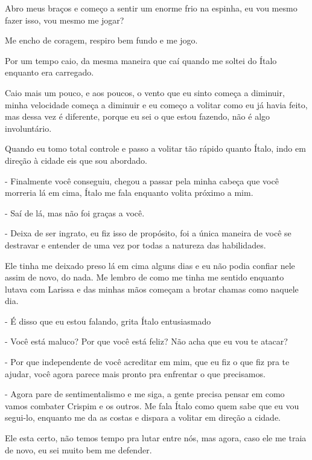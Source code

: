 Abro meus braços e começo a sentir um enorme frio na espinha, eu vou mesmo fazer isso, vou mesmo me jogar?

Me encho de coragem, respiro bem fundo e me jogo.

Por um tempo caio, da mesma maneira que caí quando me soltei do Ítalo enquanto era carregado.

Caio mais um pouco, e aos poucos, o vento que eu sinto começa a diminuir, minha velocidade começa a diminuir e eu começo a volitar como eu já havia feito, mas dessa vez é diferente, porque eu sei o que estou fazendo, não é algo involuntário.

Quando eu tomo total controle e passo a volitar tão rápido quanto Ítalo, indo em direção à cidade eis que sou abordado.

- Finalmente você conseguiu,  chegou a passar pela minha cabeça que você morreria lá em cima, Ítalo me fala enquanto volita próximo a mim.

- Saí de lá, mas não foi graças a você.

- Deixa de ser ingrato, eu fiz isso de propósito, foi a única maneira de você se destravar e entender de uma vez por todas a natureza das habilidades.

Ele tinha me deixado preso lá em cima alguns dias e eu não podia confiar nele assim de novo, do nada. Me lembro de como me tinha me sentido enquanto lutava com Larissa e das minhas mãos começam a brotar chamas como naquele dia.

- É disso que eu estou falando, grita Ítalo entusiasmado

- Você está maluco? Por que você está feliz? Não acha que eu vou te atacar?

- Por que independente de você acreditar em mim, que eu fiz o que fiz pra te ajudar, você agora parece mais pronto pra enfrentar o que precisamos.

- Agora pare de sentimentalismo e me siga, a gente precisa pensar em como vamos combater Crispim e os outros. Me fala Ítalo como quem sabe que eu vou segui-lo,  enquanto me da as costas e dispara a volitar em direção a cidade.

Ele esta certo, não temos tempo pra lutar entre nós, mas agora, caso ele me traia de novo, eu sei muito bem me defender.